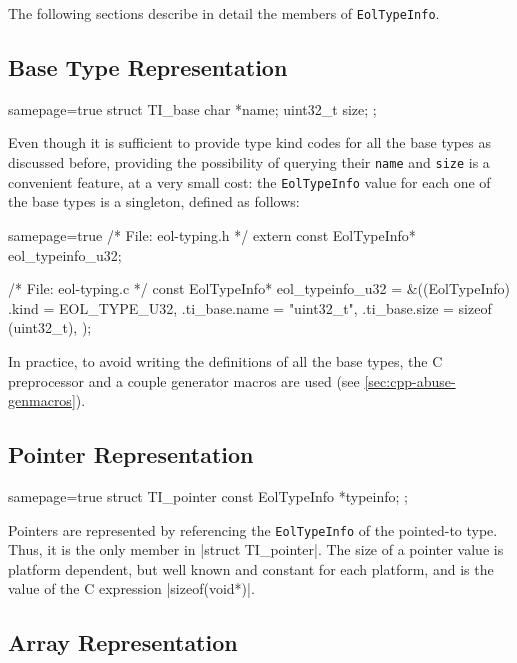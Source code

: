 \noindent
The following sections describe in detail the members of \verb|EolTypeInfo|.


\subsection{Base Type Representation}

\begin{ccode*}{samepage=true}
  struct TI_base {
    char               *name;
    uint32_t            size;
  };
\end{ccode*}

\noindent
Even though it is sufficient to provide type kind codes for all the base types
as discussed before, providing the possibility of querying their \verb|name|
and \verb|size| is a convenient feature, at a very small cost: the
\verb|EolTypeInfo| value for each one of the base types is a singleton,
defined as follows:

\begin{ccode*}{samepage=true}
  /* File: eol-typing.h */
  extern const EolTypeInfo* eol_typeinfo_u32;

  /* File: eol-typing.c */
  const EolTypeInfo* eol_typeinfo_u32 = &((EolTypeInfo) {
    .kind         = EOL_TYPE_U32,
    .ti_base.name = "uint32_t",
    .ti_base.size = sizeof (uint32_t),
  });
\end{ccode*}

\noindent In practice, to avoid writing the definitions of all the base types,
the C preprocessor and a couple generator macros are used (see
\autoref{sec:cpp-abuse-genmacros}).


\subsection{Pointer Representation}
  \label{sec:pointer-typeinfo}

\begin{ccode*}{samepage=true}
  struct TI_pointer {
    const EolTypeInfo *typeinfo;
  };
\end{ccode*}

\noindent
Pointers are represented by referencing the \verb|EolTypeInfo| of the
pointed-to type. Thus, it is the only member in \Mc|struct TI_pointer|. The
size of a pointer value is platform dependent, but well known and constant for
each platform, and is the value of the C expression \Mc|sizeof(void*)|.


\subsection{Array Representation}

